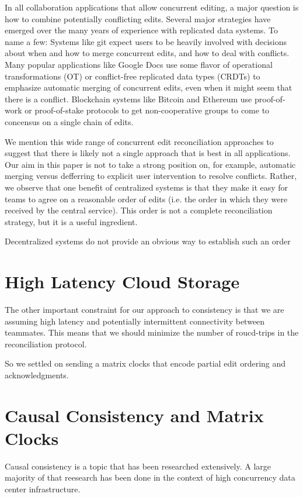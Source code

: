 \documentclass[runningheads]{llncs}
\begin{document}
In all collaboration applications that allow concurrent editing, a major question is how to combine potentially conflicting edits.
Several major strategies have emerged over the many years of experience with replicated data systems.
To name a few:
Systems like git expect users to be heavily involved with decisions about when and how to merge concurrent edits, and how to deal with conflicts.
Many popular applications like Google Docs use some flavor of operational transformations (OT) or conflict-free replicated data types (CRDTs) to emphasize automatic merging of concurrent edits, even when it might seem that there is a conflict.
Blockchain systems like Bitcoin and Ethereum use proof-of-work or proof-of-stake protocols to get non-cooperative groups to come to concensus on a single chain of edits.

We mention this wide range of concurrent edit reconciliation approaches to suggest that there is likely not a single approach that is best in all applications.
Our aim in this paper is not to take a strong position on, for example, automatic merging versus defferring to explicit user intervention to resolve conflicts.
Rather, we observe that one benefit of centralized systems is that they make it easy for teams to agree on a reasonable order of edits (i.e. the order in which they were received by the central service).
This order is not a complete reconciliation strategy, but it is a useful ingredient.

Decentralized systems do not provide an obvious way to establish such an order

\section{High Latency Cloud Storage}

The other important constraint for our approach to consistency is that we are assuming high latency and potentially intermittent connectivity between teammates.
This means that we should minimize the number of roucd-trips in the reconciliation protocol.

So we settled on sending a matrix clocks that encode partial edit ordering and acknowledgments.

\section{Causal Consistency and Matrix Clocks}

Causal consistency is a topic that has been researched extensively.
A large majority of that reesearch has been done in the context of high concurrency data center infrastructure.
\end{document}
